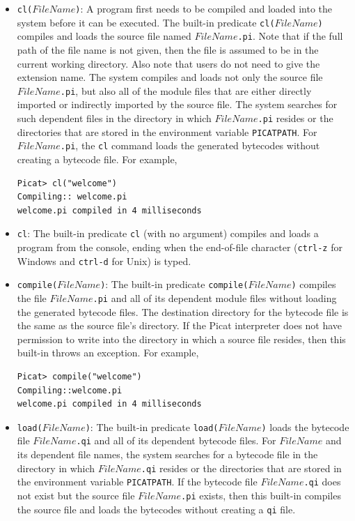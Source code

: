 \begin{itemize}
\item \texttt{cl($FileName$)}: A program first needs to be compiled and loaded into the system before it can be executed. The built-in predicate \texttt{cl($FileName$)} compiles and loads the source file named \texttt{$FileName$.pi}. Note that if the full path of the file name is not given, then the file is assumed to be in the current working directory. Also note that users do not need to give the extension name. The system compiles and loads not only the source file \texttt{$FileName$.pi}, but also all of the module files that are either directly imported or indirectly imported by the source file. The system searches for such dependent files in the directory in which \texttt{$FileName$.pi} resides or the directories that are stored in the environment variable \texttt{PICATPATH}. For \texttt{$FileName$.pi}, the \texttt{cl} command loads the generated bytecodes without creating a bytecode file. For example,
\begin{verbatim}
Picat> cl("welcome")
Compiling:: welcome.pi
welcome.pi compiled in 4 milliseconds
\end{verbatim}

\item \texttt{cl}: The built-in predicate \texttt{cl} (with no argument) compiles and loads a program from the console, ending when the end-of-file character ({\tt ctrl-z} for Windows and {\tt ctrl-d} for Unix) is typed.

\item \texttt{compile($FileName$)}: The built-in predicate \texttt{compile($FileName$)} compiles the file \texttt{$FileName$.pi} and all of its dependent module files without loading the generated bytecode files. The destination directory for the bytecode file is the same as the source file's directory. If the Picat interpreter does not have permission to write into the directory in which a source file resides, then this built-in throws an exception. For example,

\begin{verbatim}
Picat> compile("welcome")
Compiling::welcome.pi
welcome.pi compiled in 4 milliseconds
\end{verbatim}

\item \texttt{load($FileName$)}: The built-in predicate \texttt{load($FileName$)} loads the bytecode file \texttt{$FileName$.qi} and all of its dependent bytecode files. For $FileName$ and its dependent file names,  the system searches for a bytecode file in the directory in which \texttt{$FileName$.qi} resides or the directories that are stored in the environment variable \texttt{PICATPATH}. If the bytecode file \texttt{$FileName$.qi} does not exist but the source file \texttt{$FileName$.pi} exists, then this built-in compiles the source file and loads the bytecodes without creating a {\tt qi} file.


\end{itemize}
